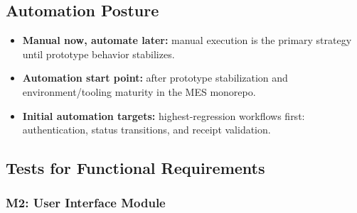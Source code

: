 \documentclass[12pt, titlepage]{article}
\begin{document}
\subsection{Automation Posture}

\begin{itemize}
  \item \textbf{Manual now, automate later:} manual execution is the primary strategy until prototype behavior stabilizes.
  \item \textbf{Automation start point:} after prototype stabilization and environment/tooling maturity in the MES monorepo.
  \item \textbf{Initial automation targets:} highest-regression workflows first: authentication, status transitions, and receipt validation.
\end{itemize}

\subsection{Tests for Functional Requirements}

\subsubsection{M2: User Interface Module}
\end{document}
